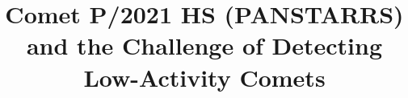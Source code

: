 \documentclass[modern]{aastex631}
\begin{document}
\begin{CJK*}{UTF8}{gbsn}

\title{Comet P/2021 HS (PANSTARRS) and the Challenge of Detecting Low-Activity Comets}




\end{CJK*}
\end{document}
